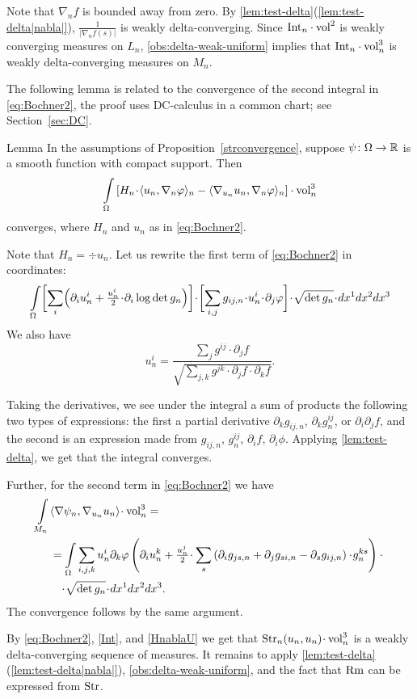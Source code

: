 Note that $\nabla_n f$ is bounded away from zero.
By \ref{lem:test-delta}(\ref{lem:test-delta|nabla|}), $\frac{1}{|\nabla_n f(s)|}$ is weakly delta-converging.
Since $\Int_n\cdot \vol^2$ is weakly converging measures on $L_n$, \ref{obs:delta-weak-uniform} implies
that $\Int_n\cdot\vol^3_n$ is weakly delta-converging measures on $M_n$.
\qeds

The following lemma is related to the convergence of the second integral in \ref{eq:Bochner2}, the proof uses
DC-calculus in a common chart; see Section~\ref{sec:DC}.

\begin{thm}{Lemma}\label{HnablaU}
In the assumptions of Proposition~\ref{strconvergence}, 
suppose $\psi\colon\Omega\to\mathbb{R}$ is a smooth function with compact support.
Then
\[\int\limits_\Omega \l[H_n\cdot\<u_n,\nabla_n\phi\>_n- \<\nabla_{u_n} u_n,\nabla_n\phi\>_n \r]\cdot\vol^3_n\]
converges, where $H_n$ and $u_n$ as in  \ref{eq:Bochner2}.
\end{thm}

Note that $H_n=\div u_n$.
Let us rewrite the first term of \ref{eq:Bochner2} in coordinates:
$$\int\limits_{\Omega}
\biggl[
\sum_{i}
\Bigl(\partial_i u_n^i
+
\tfrac{u^i_n}{2}\cdot\partial_i \log \det g_{n}\Bigr)\biggr]
\cdot
\biggl[\sum_{i,j} g_{ij,n} \cdot u_n^i\cdot \partial_j \phi\biggr]
\cdot\sqrt {\det g_n}
\cdot dx^1 dx^2 dx^3$$
We also have
$$u_n^i
=
\frac{\sum_j g^{ij}\cdot\partial_j f}
{\sqrt{\sum_{j,k}g^{jk}\cdot\partial_j f\cdot\partial_k f}}.$$

Taking the derivatives, we see under the integral a sum of products the following two types of expressions:
the first a partial derivative
$\partial_kg_{ij,n}$,
$\partial_kg^{ij}_n$,
or $\partial_i\partial_j f$,
and the second is an expression made from
$g_{ij,n}$,
$g^{ij}_n$,
$\partial_i f$,
$\partial_i \phi$.
Applying \ref{lem:test-delta}, we get that 
the integral converges.

Further, for the second term in \ref{eq:Bochner2}
we have
\begin{align*}
\int\limits_{M_n}&\<\nabla\psi_n,\nabla_{u_n} u_n\>\cdot\vol^3_n=\\
&=
\int\limits_{\Omega}
\sum_{i,j,k}
u^i_n \partial_k \phi
\left(
\partial_i u^k_n
+
\tfrac{u^j_n}2
\cdot
\sum_s
\left(
\partial_i g_{ js,n}
+
\partial_j g_{si,n}
-
\partial_s g_{i j,n}\right)
\cdot
g^{ks}_n
\right)
\cdot 
\\
&\quad\cdot\sqrt{\op{det}g_{n}}\cdot dx^1 dx^2 dx^3.
\end{align*}
The convergence follows by the same argument.
\qeds

By \ref{eq:Bochner2}, \ref{Int}, and \ref{HnablaU} we get that $\Str_n(u_n,u_n)\cdot \vol^3_n$ is a weakly delta-converging sequence of measures.
It remains to apply \ref{lem:test-delta}(\ref{lem:test-delta|nabla|}),
\ref{obs:delta-weak-uniform},
and the fact that $\operatorname{\rm Rm}$ can be expressed from $\operatorname{\rm Str}$.
\qeds
